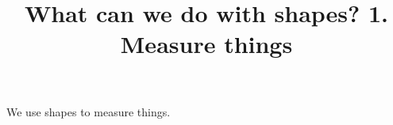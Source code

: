 \documentclass{ximera}
\title{What can we do with shapes? 1. Measure things}
\begin{document}
\begin{abstract}
\end{abstract}
\maketitle

We use shapes to measure things.
\end{document}
